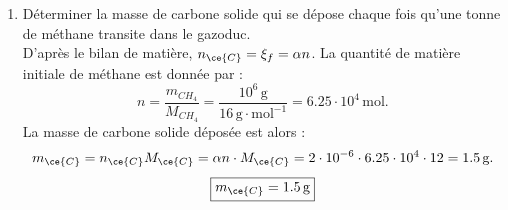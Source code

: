 \documentclass[a4paper,10pt,notitlepage,oneside]{article}
\theoremstyle{plain}
\begin{document}
\begin{enumerate}
    \item Déterminer la masse de carbone solide qui se dépose chaque fois qu’une tonne de méthane transite dans le gazoduc.\\
    D'après le bilan de matière, $n_{\ce{C}} = \xi_f = \alpha n$. La quantité de matière initiale de méthane est donnée par :
    \[
    n = \dfrac{m_{CH_4}}{M_{CH_4}} = \dfrac{10^6 \, \text{g}}{16 \, \text{g} \cdot \text{mol}^{-1}} = 6.25 \cdot 10^4 \, \text{mol}.
    \]
    La masse de carbone solide déposée est alors :
    \[
    m_{\ce{C}} = n_{\ce{C}} M_{\ce{C}} = \alpha n \cdot M_{\ce{C}} = 2 \cdot 10^{-6} \cdot 6.25 \cdot 10^4 \cdot 12 = 1.5 \, \text{g}.
    \]
    \begin{equation*}
        \boxed{m_{\ce{C}} = 1.5 \, \text{g}}
    \end{equation*}
\end{enumerate}
\end{document}
